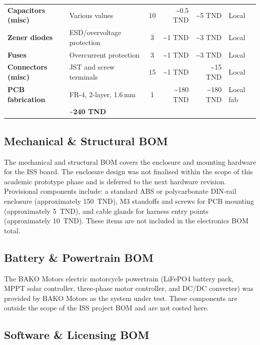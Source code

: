 \begin{table}[H]
\begin{tabular}{>{\bfseries}p{3.0cm} p{3.6cm} c r r l}
Capacitors (misc)& Various values                 & 10 & \textasciitilde0.5 TND & \textasciitilde5 TND   & Local \\
Zener diodes     & ESD/overvoltage protection     & 3  & \textasciitilde1 TND   & \textasciitilde3 TND   & Local \\
Fuses            & Overcurrent protection         & 3  & \textasciitilde1 TND   & \textasciitilde3 TND   & Local \\
Connectors (misc)& JST and screw terminals        & 15 & \textasciitilde1 TND   & \textasciitilde15 TND  & Local \\
PCB fabrication  & FR-4, 2-layer, 1.6\,mm         & 1  & \textasciitilde180 TND & \textasciitilde180 TND & Local fab \\
\midrule
\multicolumn{4}{r}{\textbf{Total Actual Cost (components + PCB)}} & \multicolumn{2}{l}{\textbf{\textasciitilde240 TND}} \\
\bottomrule
\end{tabular}
\end{table}

\subsection{Mechanical \& Structural BOM}

The mechanical and structural BOM covers the enclosure and mounting hardware for the ISS board. The enclosure design was not finalised within the scope of this academic prototype phase and is deferred to the next hardware revision. Provisional components include: a standard ABS or polycarbonate DIN-rail enclosure (approximately 150~TND), M3 standoffs and screws for PCB mounting (approximately 5~TND), and cable glands for harness entry points (approximately 10~TND). These items are not included in the electronics BOM total.

\subsection{Battery \& Powertrain BOM}

The BAKO Motors electric motorcycle powertrain (LiFePO4 battery pack, MPPT solar controller, three-phase motor controller, and DC/DC converter) was provided by BAKO Motors as the system under test. These components are outside the scope of the ISS project BOM and are not costed here.

\subsection{Software \& Licensing BOM}

